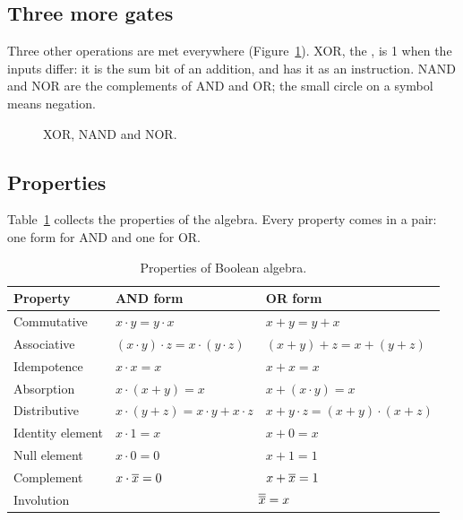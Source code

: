\subsection{Three more gates}

Three other operations are met everywhere (Figure~\ref{fig:b1:gates2}). XOR,
the , is 1 when the inputs differ: it is the sum bit of an
addition, and \riscv has it as an instruction. NAND and NOR are the
complements of AND and OR; the small circle on a symbol means negation.

\begin{figure}[htb]
\centering
{}\hfill
{}\hfill
{}
\caption{XOR, NAND and NOR.}
\label{fig:b1:gates2}
\end{figure}

\subsection{Properties}

Table~\ref{tab:b1:props} collects the properties of the algebra. Every
property comes in a pair: one form for AND and one for OR.

\begin{table}[htb]
\centering\small
\caption{Properties of Boolean algebra.}\label{tab:b1:props}
\begin{tabular}{@{}lll@{}}
\toprule
\textbf{Property} & \textbf{AND form} & \textbf{OR form}\\
\midrule
Commutative & $x\cdot y=y\cdot x$ & $x+y=y+x$\\
Associative & $(x\cdot y)\cdot z=x\cdot(y\cdot z)$ & $(x+y)+z=x+(y+z)$\\
Idempotence & $x\cdot x=x$ & $x+x=x$\\
Absorption & $x\cdot(x+y)=x$ & $x+(x\cdot y)=x$\\
Distributive & $x\cdot(y+z)=x\cdot y+x\cdot z$ & $x+y\cdot z=(x+y)\cdot(x+z)$\\
Identity element & $x\cdot 1=x$ & $x+0=x$\\
Null element & $x\cdot 0=0$ & $x+1=1$\\
Complement & $x\cdot\overline{x}=0$ & $x+\overline{x}=1$\\
Involution & \multicolumn{2}{c}{$\overline{\overline{x}}=x$}\\
\bottomrule
\end{tabular}
\end{table}

